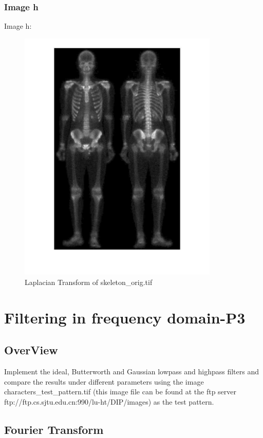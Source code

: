 \documentclass[11pt,oneside]{book}
\begin{document}
\subsection{Image h}
Image h:
\begin{figure}[!htb]
   \centering  
   \includegraphics[width=0.85\textwidth]{images/2/h.jpg}
   \caption{Laplacian Transform of skeleton\_orig.tif}  
\end{figure}
\chapter{Filtering in frequency domain-P3}
\section{OverView}
Implement the ideal, Butterworth and Gaussian lowpass and highpass filters and compare the results under different parameters using the image characters\_test\_pattern.tif (this image file can be found at the ftp server ftp://ftp.cs.sjtu.edu.cn:990/lu-ht/DIP/images) as the test pattern.

\section{Fourier Transform}
\end{document}
